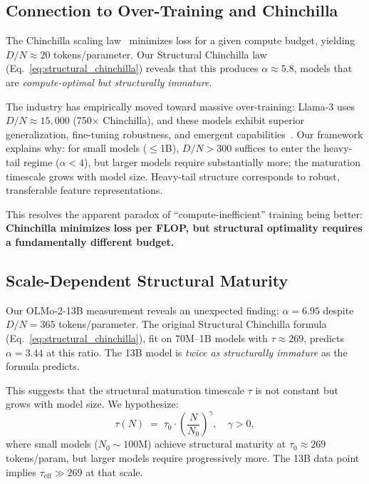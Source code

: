 \subsection{Connection to Over-Training and Chinchilla}

The Chinchilla scaling law~\citep{hoffmann2022} minimizes loss for a given compute budget, yielding $D/N \approx 20$ tokens/parameter. Our Structural Chinchilla law (Eq.~\ref{eq:structural_chinchilla}) reveals that this produces $\alpha \approx 5.8$, models that are \emph{compute-optimal but structurally immature}.

The industry has empirically moved toward massive over-training: Llama-3 uses $D/N \approx 15{,}000$ (750$\times$ Chinchilla), and these models exhibit superior generalization, fine-tuning robustness, and emergent capabilities~\citep{llama3}. Our framework explains why: for small models ($\leq$1B), $D/N > 300$ suffices to enter the heavy-tail regime ($\alpha < 4$), but larger models require substantially more; the maturation timescale grows with model size. Heavy-tail structure corresponds to robust, transferable feature representations.

This resolves the apparent paradox of ``compute-inefficient'' training being better: \textbf{Chinchilla minimizes loss per FLOP, but structural optimality requires a fundamentally different budget.}

\subsection{Scale-Dependent Structural Maturity}

Our OLMo-2-13B measurement reveals an unexpected finding: $\alpha = 6.95$ despite $D/N = 365$ tokens/parameter. The original Structural Chinchilla formula (Eq.~\ref{eq:structural_chinchilla}), fit on 70M--1B models with $\tau \approx 269$, predicts $\alpha = 3.44$ at this ratio. The 13B model is \emph{twice as structurally immature} as the formula predicts.

This suggests that the structural maturation timescale $\tau$ is not constant but grows with model size. We hypothesize:
\begin{equation}
    \tau(N) \;=\; \tau_0 \cdot \left(\frac{N}{N_0}\right)^{\!\gamma}, \quad \gamma > 0,
\end{equation}
where small models ($N_0 \sim 100\text{M}$) achieve structural maturity at $\tau_0 \approx 269$ tokens/param, but larger models require progressively more. The 13B data point implies $\tau_{\text{eff}} \gg 269$ at that scale.

